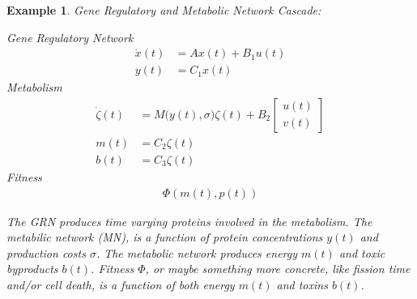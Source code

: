 \documentclass[11 pt]{article}
\newtheorem{example}{Example}
\begin{document}
  \begin{example} 
    Gene Regulatory and Metabolic Network Cascade:

    Gene Regulatory Network
    \begin{align*}
      \dot{x}(t) &= A x(t) + B_{1} u(t) \\
      y(t) &= C_{1} x(t)
    \end{align*}
      Metabolism
      \begin{align*}
      \dot{\zeta}(t) &= M\big(y(t), \sigma \big) \zeta(t) + B_{2} \begin{bmatrix} u(t) \\ v(t) \end{bmatrix} \\
        m(t) &= C_{2} \zeta(t) \\
      b(t) &= C_{3} \zeta(t)
      \end{align*}
      Fitness
      \begin{align*}
      \Phi(m(t), p(t))
    \end{align*}

    The GRN produces time varying proteins involved in the metabolism. The metabilic network (MN), is a function of protein concentrations $y(t)$ and production costs $\sigma$. The metabolic network produces energy $m(t)$ and toxic byproducts $b(t)$. Fitness $\Phi$, or maybe something more concrete, like fission time and/or cell death, is a function of both energy $m(t)$ and toxins $b(t)$. 
  \end{example}
\end{document}
